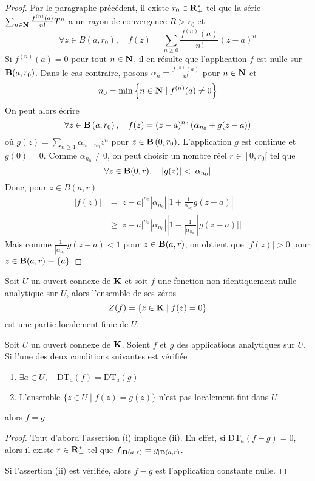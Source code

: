 \begin{proof}
   Par le paragraphe précédent, il existe $r_{0} \in \mathbf R_{+}^{*}$ tel que la série $\sum_{n \in \mathbf N} \frac{f^{(n)}(a)}{n !} T^{n}$ a un rayon de convergence $R>r_{0}$ et
\[
\forall z \in B\left(a, r_{0}\right), \quad f(z)=\sum_{n \geqslant 0} \frac{f^{(n)}(a)}{n !}(z-a)^{n}
\]
    Si $f^{(n)}(a)=0$ pour tout $n \in \mathbf N$, il en résulte que l'application $f$ est nulle sur $\mathbf B(a, r_{0})$. Dans le cas contraire, posons $\alpha_{n}=\frac{f^{(n)}(a)}{n !}$ pour $n \in \mathbf N$ et
\[
n_{0}=\min \left\{n \in \mathbf N \mid f^{(n)}(a) \neq 0\right\}
\]
On peut alors écrire
\[
\forall z \in \mathbf B\left(a, r_{0}\right), \quad f(z)=(z-a)^{n_{0}}\left(\alpha_{n_{0}}+g(z-a)\right)
\]
où $g(z)=\sum_{n \geqslant 1} \alpha_{n+n_{0}} z^{n}$ pour $z \in \mathbf B\left(0, r_{0}\right)$. L'application $g$ est continue et $g(0)=0 .$ Comme $\alpha_{n_{0}} \neq 0$, on peut choisir un nombre réel $\left.r \in\right] 0, r_{0}[$ tel que
\[
\forall z \in \mathbf B(0, r), \quad|g(z)|<\left|\alpha_{n_{0}}\right|
\]
Donc, pour $z \in B(a, r)$
\[
\begin{aligned}
|f(z)| &=|z-a|^{n_{0}}\left|\alpha_{n_{0}}\right|\left|1+\frac{1}{\alpha_{n_{0}}} g(z-a)\right| \\
& \geqslant|z-a|^{n_{0}}\left|\alpha_{n_{0}}\right|\left|1-\frac{1}{\left|\alpha_{n_{0}}\right|}\right| g(z-a)||
\end{aligned}
\]
Mais comme $\frac{1}{\left|\alpha_{n_{0}}\right|} g(z-a)<1$ pour $z \in \mathbf B(a, r)$, on obtient que $|f(z)|>0$ pour $z \in \mathbf B(a, r)\bm- \{a\}$
\end{proof}

\begin{cor}
Soit $U$ un ouvert connexe de $\mathbf K$ et soit $f$ une fonction non identiquement nulle analytique sur $U$, alors l'ensemble de ses zéros
\[
Z(f)=\{z \in \mathbf K \mid f(z)=0\}
\]
est une partie localement finie de $U$.
\end{cor}

\begin{cor}
    Soit $U$ un ouvert connexe de $\mathbf K$. Soient $f$ et $g$ des applications analytiques sur $U$. Si l'une des deux conditions suivantes est vérifiée \begin{enumerate}[label=(\roman*)]
\item $\exists a \in U, \quad \mathrm{DT}_{a}(f)=\mathrm{DT}_{a}(g)$
\item L'ensemble $\{z \in U \mid f(z)=g(z)\}$ n'est pas localement fini dans $U$
\end{enumerate}
alors $f=g$
\end{cor}
\begin{proof}
Tout d'abord l'assertion (i) implique (ii). En effet, si $\mathrm{DT}_{a}(f-g)=0$, alors il existe $r \in \mathbf R_{+}^{\star}$ tel que $f_{\mid \mathbf B(a, r)}=g_{\mid \mathbf B(a, r)}$.

Si l'assertion (ii) est vérifiée, alors $f-g$ est l'application constante nulle.
\end{proof}

